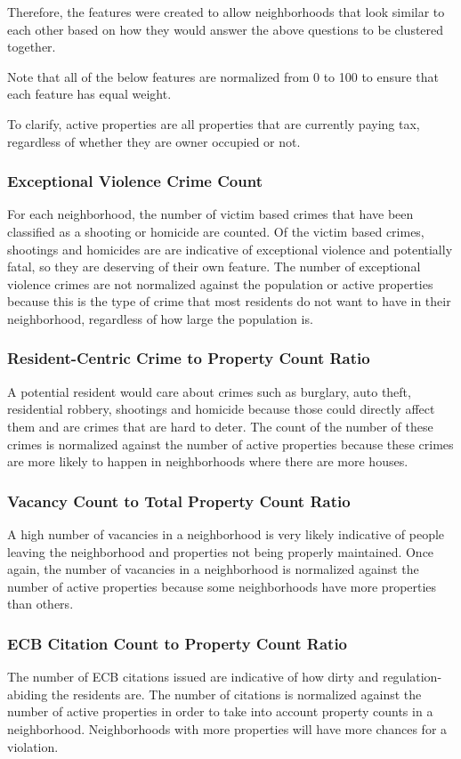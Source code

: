 \documentclass[conference]{IEEEtran}
\begin{document}
Therefore, the features were created to allow neighborhoods that look similar to each other based on how they would answer
the above questions to be clustered together.

Note that all of the below features are normalized from 0 to 100 to ensure that each feature has equal weight.

To clarify, active properties are all properties that are currently paying tax, regardless of whether they are owner occupied
or not.

\subsubsection{Exceptional Violence Crime Count}
For each neighborhood, the number of victim based crimes that have been classified as a shooting or homicide are counted.
Of the victim based crimes, shootings and homicides are are indicative of exceptional violence and potentially
fatal, so they are deserving of their own feature.  The number of exceptional violence crimes are not normalized against the population
or active properties because this is the type of crime that most residents do not want to have in their neighborhood, regardless
of how large the population is.

\subsubsection{Resident-Centric Crime to Property Count Ratio}
A potential resident would care about crimes such as burglary, auto theft, residential robbery, shootings and homicide
because those could directly affect them and are crimes that are hard to deter.  The count of the number of these crimes
is normalized against the number of active properties because these crimes are more likely to happen
in neighborhoods where there are more houses.

\subsubsection{Vacancy Count to Total Property Count Ratio}
A high number of vacancies in a neighborhood is very likely indicative of people leaving the neighborhood and properties
not being properly maintained.  Once again, the number of vacancies in a neighborhood is normalized against the number
of active properties because some neighborhoods have more properties than others.

\subsubsection{ECB Citation Count to Property Count Ratio}
The number of ECB citations issued are indicative of how dirty and regulation-abiding the residents are.  The
number of citations is normalized against the number of active properties in order to take into account property counts in a neighborhood.
Neighborhoods with more properties will have more chances for a violation.
\end{document}
